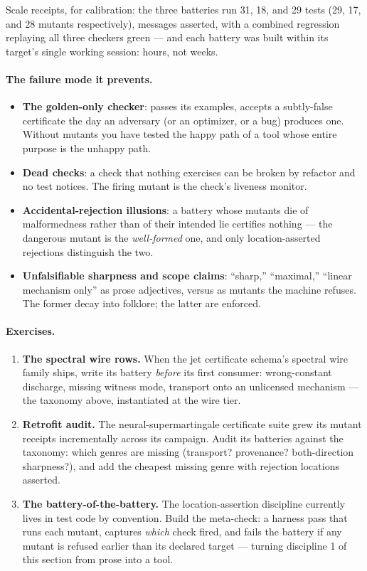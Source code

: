 Scale receipts, for calibration: the three batteries run 31, 18, and 29
tests (29, 17, and 28 mutants respectively), messages asserted, with a
combined regression replaying all three checkers green --- and each
battery was built within its target's single working session: hours,
not weeks.

\paragraph{The failure mode it prevents.}
\begin{itemize}
\item \textbf{The golden-only checker}: passes its examples, accepts a
  subtly-false certificate the day an adversary (or an optimizer, or a
  bug) produces one. Without mutants you have tested the happy path of
  a tool whose entire purpose is the unhappy path.
\item \textbf{Dead checks}: a check that nothing exercises can be
  broken by refactor and no test notices. The firing mutant is the
  check's liveness monitor.
\item \textbf{Accidental-rejection illusions}: a battery whose mutants
  die of malformedness rather than of their intended lie certifies
  nothing --- the dangerous mutant is the \emph{well-formed} one, and
  only location-asserted rejections distinguish the two.
\item \textbf{Unfalsifiable sharpness and scope claims}: ``sharp,''
  ``maximal,'' ``linear mechanism only'' as prose adjectives, versus as
  mutants the machine refuses. The former decay into folklore; the
  latter are enforced.
\end{itemize}

\paragraph{Exercises.}
\begin{enumerate}
\item \textbf{The spectral wire rows.} When the jet certificate
  schema's spectral wire family ships, write its battery \emph{before}
  its first consumer: wrong-constant discharge, missing witness mode,
  transport onto an unlicensed mechanism --- the taxonomy above,
  instantiated at the wire tier.
\item \textbf{Retrofit audit.} The neural-supermartingale certificate
  suite grew its mutant receipts incrementally across its campaign.
  Audit its batteries against the taxonomy: which genres are missing
  (transport? provenance? both-direction sharpness?), and add the
  cheapest missing genre with rejection locations asserted.
\item \textbf{The battery-of-the-battery.} The location-assertion
  discipline currently lives in test code by convention. Build the
  meta-check: a harness pass that runs each mutant, captures
  \emph{which} check fired, and fails the battery if any mutant is
  refused earlier than its declared target --- turning discipline 1 of
  this section from prose into a tool.
\end{enumerate}

